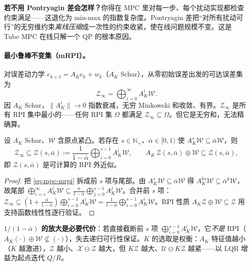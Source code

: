 \begin{insight}
\textbf{若不用 Pontryagin 差会怎样？}\;你得在 MPC 里对每一步、每个扰动实现都检查约束满足——这退化为 min-max 的指数复杂度。Pontryagin 差把“对所有扰动可行”的无穷维约束\emph{离线压缩}成一次性的约束收紧，使在线问题规模不变。这是 Tube MPC 在线只解一个 QP 的根本原因。
\end{insight}

\paragraph{最小鲁棒不变集（mRPI）。}
对误差动力学 $e_{k+1}=A_Ke_k+w_k$（$A_K$ Schur），从零初始误差出发的可达误差集为
\begin{equation}
  \mathcal Z_\infty=\bigoplus_{i=0}^{\infty}A_K^i\mathcal W.
  \label{eq:mpc-mrpi}
\end{equation}
因 $A_K$ Schur，$\|A_K^i\|\to0$ 指数衰减，无穷 Minkowski 和收敛、有界。$\mathcal Z_\infty$ 是所有 RPI 集中最小的——任何 RPI 集 $\Omega$ 都满足 $\mathcal Z_\infty\subseteq\Omega$。但它是无穷和，无法精确算。

\begin{theorem}
\label{thm:mpc-rakovic}
设 $A_K$ Schur、$\mathcal W$ 含原点紧凸。若存在 $s\in\mathbb N_+$、$\bar\alpha\in[0,1)$ 使 $A_K^s\mathcal W\subseteq\bar\alpha\mathcal W$，则
\begin{equation}
  \mathcal Z_\infty\subseteq\mathcal Z(s,\bar\alpha):=\frac{1}{1-\bar\alpha}\bigoplus_{i=0}^{s-1}A_K^i\mathcal W,\qquad A_K\,\mathcal Z(s,\bar\alpha)\oplus\mathcal W\subseteq\mathcal Z(s,\bar\alpha),
  \label{eq:mpc-rakovic}
\end{equation}
即 $\mathcal Z(s,\bar\alpha)$ 是可计算的 RPI 外近似。
\end{theorem}

\begin{proof}
把 \cref{eq:mpc-mrpi} 拆成前 $s$ 项与尾部。由 $A_K^s\mathcal W\subseteq\bar\alpha\mathcal W$ 得 $A_K^{ks}\mathcal W\subseteq\bar\alpha^k\mathcal W$，故尾部 $\bigoplus_{i=s}^\infty A_K^i\mathcal W\subseteq\tfrac{\bar\alpha}{1-\bar\alpha}\bigoplus_{j=0}^{s-1}A_K^j\mathcal W$。合并前 $s$ 项：$\mathcal Z_\infty\subseteq(1+\tfrac{\bar\alpha}{1-\bar\alpha})\bigoplus_{i=0}^{s-1}A_K^i\mathcal W=\tfrac1{1-\bar\alpha}\bigoplus_{i=0}^{s-1}A_K^i\mathcal W$。RPI 性质 $A_K\mathcal Z\oplus\mathcal W\subseteq\mathcal Z$ 用支持函数线性性逐行验证。
\end{proof}

\begin{remark}
\textbf{$1/(1-\bar\alpha)$ 的放大是必要代价}：若直接截断前 $s$ 项 $\bigoplus_{i=0}^{s-1}A_K^i\mathcal W$，它\emph{不是} RPI（$A_K(\cdot)\oplus\mathcal W\not\subseteq(\cdot)$），失去递归可行性保证。$K$ 的选取是权衡：$A_K$ 特征值越小（$K$ 越激进），$\mathcal Z$ 越小、$\mathcal X\ominus\mathcal Z$ 越大，但 $K\mathcal Z$ 越大、$\mathcal U\ominus K\mathcal Z$ 越紧——以 LQR 增益为起点迭代 $Q/R$。
\end{remark}

